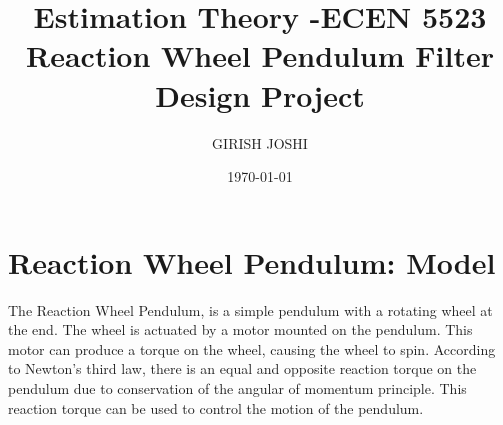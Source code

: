 \documentclass[a4paper]{article}
\date{\today}
\title{Estimation Theory -ECEN 5523 \\Reaction Wheel Pendulum Filter Design Project}
\author{GIRISH JOSHI}
\begin{document}
	\maketitle
\fontsize{12}{14}
\selectfont


\section{Reaction Wheel Pendulum: Model}
The Reaction Wheel Pendulum, is a simple pendulum with a rotating wheel at the end. The wheel is actuated by a motor mounted on the pendulum. This motor can produce a torque on the wheel, causing
the wheel to spin. According to Newton’s third law, there is an equal and opposite
reaction torque on the pendulum due to conservation of the angular of momentum principle. This reaction torque can be
used to control the motion of the pendulum.\\
\end{document}
